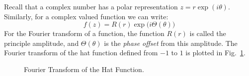         Recall that a complex number has a polar representation
        $z=r\exp(i\theta)$. Similarly, for a complex valued
        function we can write:
        \begin{equation}
            f(z)=R(r)\exp\big(i\Theta(\theta)\big)
        \end{equation}
        For the Fourier transform of a function, the function
        $R(r)$ is called the principle amplitude, and
        $\Theta(\theta)$ is the \textit{phase offset} from
        this amplitude. The Fourier transform of the hat
        function defined from $\minus{1}$ to $1$ is plotted
        in Fig.~\ref{fig:Diff_Theory_FT_of_Hat_Func}.
        \begin{figure}[H]
            \centering
            \captionsetup{type=figure}
            \begin{subfigure}[b]{0.49\textwidth}
                \centering
                \resizebox{\textwidth}{!}{%
                    
                }
            \end{subfigure}
            \begin{subfigure}[b]{0.49\textwidth}
                \centering
                \resizebox{\textwidth}{!}{%
                    
                }
            \end{subfigure}
            \caption{Fourier Transform of the Hat Function.}
            \label{fig:Diff_Theory_FT_of_Hat_Func}
        \end{figure}
